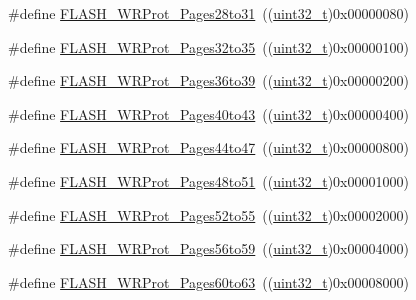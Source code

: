 \begin{DoxyCompactItemize}
\item 
\#define \hyperlink{group___option___bytes___write___protection_ga800860d071cfb40b1b0e94111a0cb549}{F\+L\+A\+S\+H\+\_\+\+W\+R\+Prot\+\_\+\+Pages28to31}~((\hyperlink{_p_e___types_8h_a33594304e786b158f3fb30289278f5af}{uint32\+\_\+t})0x00000080)
\item 
\#define \hyperlink{group___option___bytes___write___protection_ga81a4250850e5fe7c251365cc22839a96}{F\+L\+A\+S\+H\+\_\+\+W\+R\+Prot\+\_\+\+Pages32to35}~((\hyperlink{_p_e___types_8h_a33594304e786b158f3fb30289278f5af}{uint32\+\_\+t})0x00000100)
\item 
\#define \hyperlink{group___option___bytes___write___protection_ga783f47425af52b9a12914520d9ee175e}{F\+L\+A\+S\+H\+\_\+\+W\+R\+Prot\+\_\+\+Pages36to39}~((\hyperlink{_p_e___types_8h_a33594304e786b158f3fb30289278f5af}{uint32\+\_\+t})0x00000200)
\item 
\#define \hyperlink{group___option___bytes___write___protection_ga30798723c36db2b8145b6a5c8ffafded}{F\+L\+A\+S\+H\+\_\+\+W\+R\+Prot\+\_\+\+Pages40to43}~((\hyperlink{_p_e___types_8h_a33594304e786b158f3fb30289278f5af}{uint32\+\_\+t})0x00000400)
\item 
\#define \hyperlink{group___option___bytes___write___protection_gaa2d897455d5f71c9fd3721d49b3578fc}{F\+L\+A\+S\+H\+\_\+\+W\+R\+Prot\+\_\+\+Pages44to47}~((\hyperlink{_p_e___types_8h_a33594304e786b158f3fb30289278f5af}{uint32\+\_\+t})0x00000800)
\item 
\#define \hyperlink{group___option___bytes___write___protection_gac6bb79080cb276b330499f26c706048e}{F\+L\+A\+S\+H\+\_\+\+W\+R\+Prot\+\_\+\+Pages48to51}~((\hyperlink{_p_e___types_8h_a33594304e786b158f3fb30289278f5af}{uint32\+\_\+t})0x00001000)
\item 
\#define \hyperlink{group___option___bytes___write___protection_gab5beefbfebf060f71421995f3c7a6418}{F\+L\+A\+S\+H\+\_\+\+W\+R\+Prot\+\_\+\+Pages52to55}~((\hyperlink{_p_e___types_8h_a33594304e786b158f3fb30289278f5af}{uint32\+\_\+t})0x00002000)
\item 
\#define \hyperlink{group___option___bytes___write___protection_ga3705c210feeeb63c31976495c0b851f1}{F\+L\+A\+S\+H\+\_\+\+W\+R\+Prot\+\_\+\+Pages56to59}~((\hyperlink{_p_e___types_8h_a33594304e786b158f3fb30289278f5af}{uint32\+\_\+t})0x00004000)
\item 
\#define \hyperlink{group___option___bytes___write___protection_ga1978945fc02d1867900f17c4999c50d5}{F\+L\+A\+S\+H\+\_\+\+W\+R\+Prot\+\_\+\+Pages60to63}~((\hyperlink{_p_e___types_8h_a33594304e786b158f3fb30289278f5af}{uint32\+\_\+t})0x00008000)

\end{DoxyCompactItemize}

